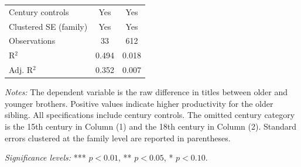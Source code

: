 \begin{table}[H]
\begin{tablebody}
\begin{tabular}{l c c}
\midrule
Century controls & Yes & Yes \\
Clustered SE (family) & Yes & Yes \\
\midrule
Observations & 33 & 612 \\
R$^{2}$ & 0.494 & 0.018 \\
Adj. R$^{2}$ & 0.352 & 0.007 \\
\bottomrule
\end{tabular}
\end{tablebody}

\vspace{4pt}
\begin{minipage}{\textwidth}
\footnotesize
\textit{Notes:} The dependent variable is the raw difference in titles between older and younger brothers. Positive values indicate higher productivity for the older sibling. All specifications include century controls. The omitted century category is the 15th century in Column (1) and the 18th century in Column (2). Standard errors clustered at the family level are reported in parentheses.

\textit{Significance levels:} *** $p<0.01$, ** $p<0.05$, * $p<0.10$.
\end{minipage}

\end{table}